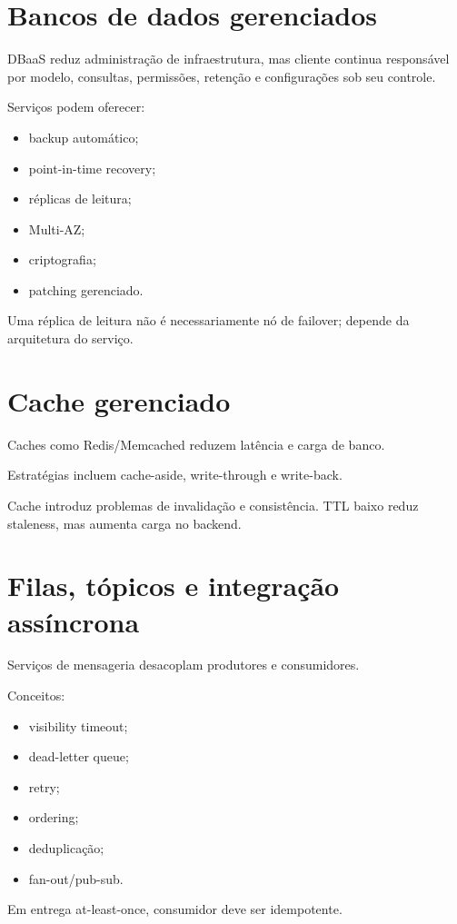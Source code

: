 \section{Bancos de dados gerenciados}

DBaaS reduz administração de infraestrutura, mas cliente continua responsável por modelo, consultas, permissões, retenção e configurações sob seu controle.

Serviços podem oferecer:
\begin{itemize}
\item backup automático;
\item point-in-time recovery;
\item réplicas de leitura;
\item Multi-AZ;
\item criptografia;
\item patching gerenciado.
\end{itemize}

Uma réplica de leitura não é necessariamente nó de failover; depende da arquitetura do serviço.

\section{Cache gerenciado}

Caches como Redis/Memcached reduzem latência e carga de banco.

Estratégias incluem cache-aside, write-through e write-back.

Cache introduz problemas de invalidação e consistência. TTL baixo reduz staleness, mas aumenta carga no backend.

\section{Filas, tópicos e integração assíncrona}

Serviços de mensageria desacoplam produtores e consumidores.

Conceitos:
\begin{itemize}
\item visibility timeout;
\item dead-letter queue;
\item retry;
\item ordering;
\item deduplicação;
\item fan-out/pub-sub.
\end{itemize}

Em entrega at-least-once, consumidor deve ser idempotente.

